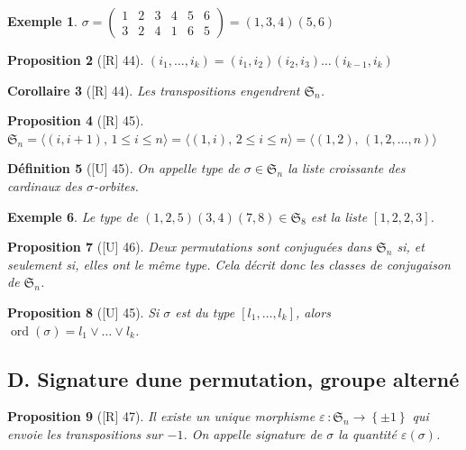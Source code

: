 \documentclass[10pt, a4paper, parskip=full, twoside, twocolumn]{report}
\newtheorem{definition}{Définition}
\newtheorem{proposition}[definition]{Proposition}
\newtheorem{corollary}[definition]{Corollaire}
\newtheorem{example}[definition]{Exemple}
\DeclareMathOperator{\ord}{ord}
\begin{document}
\begin{example}
	$\sigma = \left(\begin{smallmatrix} 
			1 & 2 & 3 & 4 & 5 & 6 \\
			3 & 2 & 4 & 1 & 6 & 5
		\end{smallmatrix}\right) = (1,3,4)(5,6)$
\end{example}

\begin{proposition}[\textnormal{[R] 44}]
		$(i_1,\dots,i_k) = (i_1,i_2)(i_2,i_3)\dots(i_{k-1},i_k)$
\end{proposition}
\begin{corollary}[\textnormal{[R] 44}]
	Les transpositions engendrent $\mathfrak{S}_n$.
\end{corollary}
\begin{proposition}[\textnormal{[R] 45}]
	$\mathfrak{S}_n = \langle(i,i+1),\, 1\leq i\leq n\rangle = \langle (1,i), \, 2\leq i \leq n\rangle = \langle(1,2),\, (1,2,\dots, n) \rangle$
\end{proposition}

\begin{definition}[\textnormal{[U] 45}]
	On appelle \emph{type} de $\sigma\in\mathfrak{S}_n$ la liste croissante des cardinaux des $\sigma$-orbites.
\end{definition}

\begin{example}
	Le type de $(1,2,5)(3,4)(7,8)\in\mathfrak{S}_8$ est la liste $\left[1,2,2,3\right]$.
\end{example}

\begin{proposition}[\textnormal{[U] 46}]
	Deux permutations sont conjuguées dans $\mathfrak{S}_n$ si, et seulement si, elles ont le même type.
	Cela décrit donc les classes de conjugaison de $\mathfrak{S}_n$.
\end{proposition}

\begin{proposition}[\textnormal{[U] 45}]
	Si $\sigma$ est du type $\left[l_1,\dots,l_k\right]$, alors $\ord(\sigma) = l_1 \vee \dots \vee l_k$.
\end{proposition}

\subsection*{D. Signature dune permutation, groupe alterné}

\begin{proposition}[\textnormal{[R] 47}]
	Il existe un unique morphisme $\varepsilon\,\colon \mathfrak{S}_n \to \left\{\pm 1\right\}$ qui envoie
	les transpositions sur $-1$. On appelle \emph{signature} de $\sigma$ la quantité $\varepsilon(\sigma)$.
\end{proposition}
\end{document}
